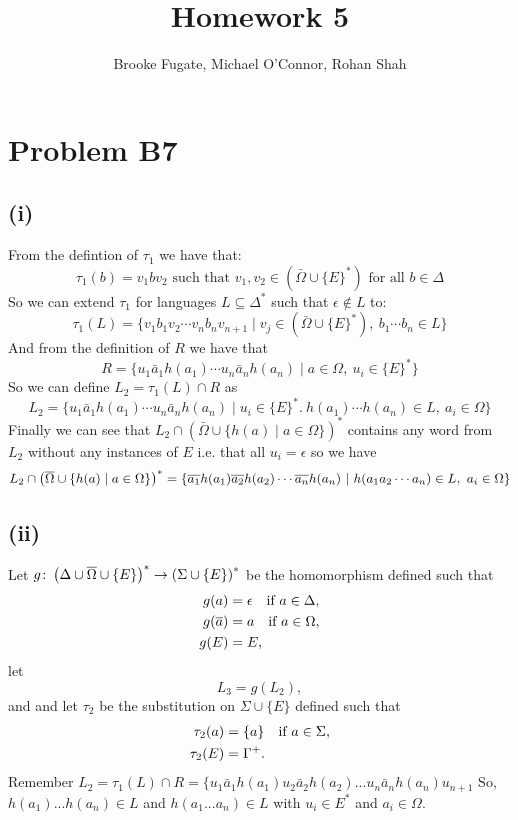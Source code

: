 \documentclass[12pt]{article}
\begin{document}
\pagestyle{plain}
\titleformat{\subsection}[runin]
  {\normalfont\large\bfseries}{\thesubsection}{1em}{}

\title{Homework 5}
\author{Brooke Fugate, Michael O'Connor, Rohan Shah}
\date{}

\maketitle

\section*{Problem B7}

\subsection*{(i)} From the defintion of $\tau_1$ we have that:
$$\tau_1(b)= v_1bv_2 \text{ such that } v_1,v_2 \in (\bar\Omega \cup \{E\}^*)
\text{ for all } b\in \Delta$$
So we can extend $\tau_1$ for languages $L \subseteq \Delta^*$ such that
$\epsilon \not\in L$ to:
$$\tau_1(L) = \{v_1b_1v_2\cdots v_nb_nv_{n+1} \mid
v_j \in (\bar\Omega \cup \{E\}^*),\ b_1\cdots b_n \in L\}$$
And from the definition of $R$ we have that
$$ R = \{u_1\bar a_1h(a_1)\cdots u_n\bar a_nh(a_n)
\mid a\in \Omega,\ u_i\in \{E\}^*\}$$
So we can define $L_2 = \tau_1(L) \cap R$ as
$$L_2 = \{u_1\bar a_1h(a_1)\cdots u_n\bar a_nh(a_n)
\mid u_i \in \{E\}^*.\ h(a_1)\cdots h(a_n) \in L,\ a_i\in \Omega\}$$
Finally we can see that $L_2 \cap (\bar\Omega\cup\{h(a) \mid a\in \Omega\})^*$
contains any word from $L_2$ without any instances of $E$ i.e. that all
$u_i = \epsilon$ so we have
$$L_2\cap \left(\ptb{\Omega}\cup \{h(a) \mid a\in\Omega\}\right)^*
=\{\ptb{a_1}h(a_1) \ptb{a_2}h(a_2)\cdots \ptb{a_n}h(a_n)\ |\ 
h(a_1a_2\cdots a_n)\in L,\ a_i\in \Omega\}$$


\subsection*{(ii)}

Let $g\colon \left(\Delta\cup\overline{\Omega}\cup\{E\}\right)^*\rightarrow \left(\Sigma\cup \{E\}\right)^*$
be the homomorphism defined such that
\begin{align*}
g(a) &= \epsilon\quad \hbox{if $a\in\Delta$},\\
g(\overline{a}) &= a\quad \hbox{if $a\in\Omega$},\\
g(E) &= E,
\end{align*}
let 
\[L_3 = g(L_2),\]
and
and let $\tau_2$ be the substitution on $\Sigma\cup\{E\}$
defined such that
\begin{align*}
\tau_2(a) &= \{a\}\quad \hbox{if $a\in\Sigma$},\\
\tau_2(E) &= \Gamma^+.
\end{align*}
Remember $L_2 = \tau_1(L) \cap R = \{u_1\bar a_1h(a_1)u_2\bar a_2 h(a_2)...u_n \bar a_n h(a_n) u_{n+1}$ So, $h(a_1)...h(a_n) \in L$ and $h(a_1...a_n) \in L$ with $u_i \in E^*$ and $a_i \in \Omega$. 
\end{document}
